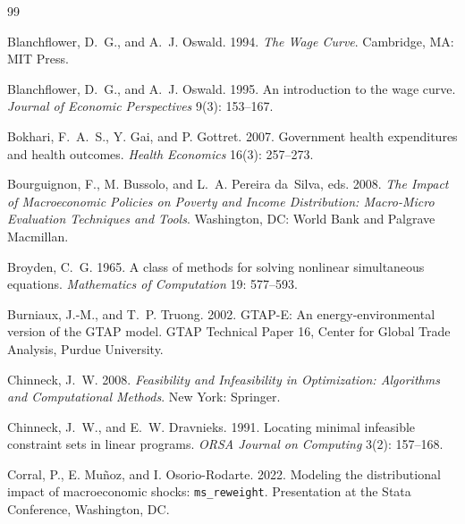 \renewcommand{\bibname}{References}
\begin{thebibliography}{99}
\setlength{\itemsep}{2pt}
\small

Blanchflower, D.~G., and A.~J. Oswald. 1994.
\newblock \emph{The Wage Curve}.
\newblock Cambridge, MA: MIT Press.

Blanchflower, D.~G., and A.~J. Oswald. 1995.
\newblock An introduction to the wage curve.
\newblock \emph{Journal of Economic Perspectives} 9(3): 153--167.

Bokhari, F.~A.~S., Y. Gai, and P. Gottret. 2007.
\newblock Government health expenditures and health outcomes.
\newblock \emph{Health Economics} 16(3): 257--273.

Bourguignon, F., M. Bussolo, and L.~A. Pereira da~Silva, eds. 2008.
\newblock \emph{The Impact of Macroeconomic Policies on Poverty and Income
  Distribution: Macro-Micro Evaluation Techniques and Tools}.
\newblock Washington, DC: World Bank and Palgrave Macmillan.

Broyden, C.~G. 1965.
\newblock A class of methods for solving nonlinear simultaneous equations.
\newblock \emph{Mathematics of Computation} 19: 577--593.

Burniaux, J.-M., and T.~P. Truong. 2002.
\newblock GTAP-E: An energy-environmental version of the GTAP model.
\newblock GTAP Technical Paper 16, Center for Global Trade Analysis, Purdue
  University.

Chinneck, J.~W. 2008.
\newblock \emph{Feasibility and Infeasibility in Optimization: Algorithms
  and Computational Methods}.
\newblock New York: Springer.

Chinneck, J.~W., and E.~W. Dravnieks. 1991.
\newblock Locating minimal infeasible constraint sets in linear programs.
\newblock \emph{ORSA Journal on Computing} 3(2): 157--168.

Corral, P., E. Mu\~noz, and I. Osorio-Rodarte. 2022.
\newblock Modeling the distributional impact of macroeconomic shocks:
  \texttt{ms\_reweight}.
\newblock Presentation at the Stata Conference, Washington, DC.


\end{thebibliography}
